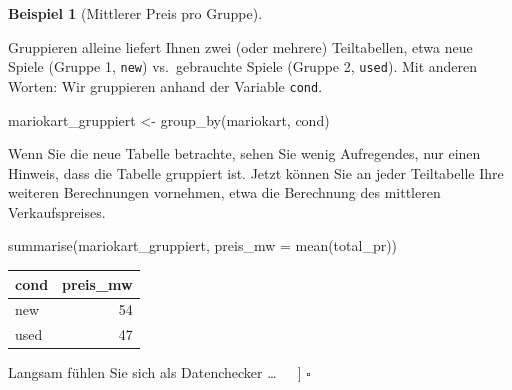 \documentclass[
  a4paper,
]{scrbook}
\newenvironment{Shaded}{\begin{snugshade}}{\end{snugshade}}
\newcommand{\AttributeTok}[1]{\textcolor[rgb]{0.40,0.45,0.13}{#1}}
\newcommand{\FunctionTok}[1]{\textcolor[rgb]{0.28,0.35,0.67}{#1}}
\newcommand{\NormalTok}[1]{\textcolor[rgb]{0.00,0.23,0.31}{#1}}
\newcommand{\OtherTok}[1]{\textcolor[rgb]{0.00,0.23,0.31}{#1}}
\theoremstyle{definition}
\newtheorem{example}{Beispiel}[chapter]
\theoremstyle{definition}
\theoremstyle{definition}
\theoremstyle{remark}
\begin{document}
\begin{example}[Mittlerer Preis pro
Gruppe]\protect\hypertarget{exm-groupby}{}\label{exm-groupby}

Gruppieren alleine liefert Ihnen zwei (oder mehrere) Teiltabellen, etwa
neue Spiele (Gruppe 1, \texttt{new}) vs.~gebrauchte Spiele (Gruppe 2,
\texttt{used}). Mit anderen Worten: Wir gruppieren anhand der Variable
\texttt{cond}.

\begin{Shaded}
\begin{Highlighting}[]
\NormalTok{mariokart\_gruppiert }\OtherTok{\textless{}{-}} \FunctionTok{group\_by}\NormalTok{(mariokart, cond)}
\end{Highlighting}
\end{Shaded}

Wenn Sie die neue Tabelle betrachte, sehen Sie wenig Aufregendes, nur
einen Hinweis, dass die Tabelle gruppiert ist. Jetzt können Sie an jeder
Teiltabelle Ihre weiteren Berechnungen vornehmen, etwa die Berechnung
des mittleren Verkaufspreises.

\begin{Shaded}
\begin{Highlighting}[]
\FunctionTok{summarise}\NormalTok{(mariokart\_gruppiert, }\AttributeTok{preis\_mw =} \FunctionTok{mean}\NormalTok{(total\_pr))}
\end{Highlighting}
\end{Shaded}

\begin{longtable}[]{@{}lr@{}}
\toprule\noalign{}
cond & preis\_mw \\
\midrule\noalign{}
\endhead
\bottomrule\noalign{}
\endlastfoot
new & 54 \\
used & 47 \\
\end{longtable}

Langsam fühlen Sie sich als Datenchecker \ldots{} {🥷 🦹‍♀}{]} \(\square\)

\end{example}
\end{document}
